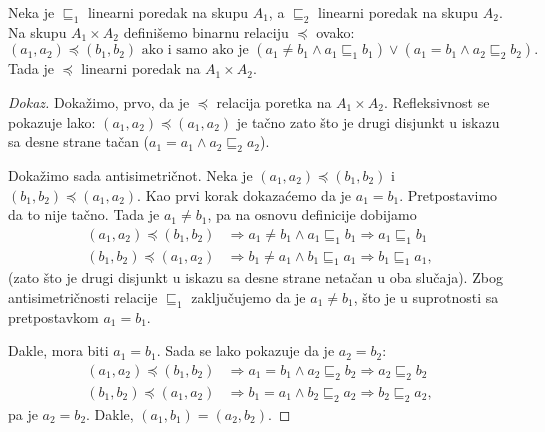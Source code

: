\begin{THM}\label{ft07.thm.lex-2}
  Neka je $\sqsubseteq_1$ linearni poredak na skupu $A_1$, a $\sqsubseteq_2$ linearni poredak na skupu $A_2$.
  Na skupu $A_1 \times A_2$ defini\v semo binarnu relaciju $\preccurlyeq$ ovako:
  $$
    (a_1, a_2) \preccurlyeq (b_1, b_2) \text{\ \ ako i samo ako je\ \ }
    (a_1 \ne b_1 \land a_1 \mathrel{\sqsubseteq_1} b_1) \lor (a_1 = b_1 \land a_2 \mathrel{\sqsubseteq_2} b_2).
  $$
  Tada je $\preccurlyeq$ linearni poredak na $A_1 \times A_2$.
\end{THM}
\begin{proof}[Dokaz]
  Doka\v zimo, prvo, da je $\preccurlyeq$ relacija poretka na $A_1 \times A_2$. Refleksivnost se pokazuje lako:
  $(a_1, a_2) \preccurlyeq (a_1, a_2)$ je ta\v cno zato \v sto je drugi disjunkt u iskazu sa desne strane ta\v can
  ($a_1 = a_1 \land a_2 \mathrel{\sqsubseteq_2} a_2$).
  
  \medskip
  
  Doka\v zimo sada antisimetri\v cnot. Neka je $(a_1, a_2) \preccurlyeq (b_1, b_2)$ i $(b_1, b_2) \preccurlyeq (a_1, a_2)$.
  Kao prvi korak dokaza\'cemo da je $a_1 = b_1$. Pretpostavimo da to nije ta\v cno. Tada je $a_1 \ne b_1$, pa na osnovu
  definicije dobijamo
  \begin{align*}
    (a_1, a_2) \preccurlyeq (b_1, b_2) &\Rightarrow a_1 \ne b_1 \land a_1 \mathrel{\sqsubseteq_1} b_1 \Rightarrow a_1 \mathrel{\sqsubseteq_1} b_1\\
    (b_1, b_2) \preccurlyeq (a_1, a_2) &\Rightarrow b_1 \ne a_1 \land b_1 \mathrel{\sqsubseteq_1} a_1 \Rightarrow b_1 \mathrel{\sqsubseteq_1} a_1,
  \end{align*}
  (zato \v sto je drugi disjunkt u iskazu sa desne strane neta\v can u oba slu\v caja). Zbog antisimetri\v cnosti relacije $\sqsubseteq_1$
  zaklju\v cujemo da je $a_1 \ne b_1$, \v sto je u suprotnosti sa pretpostavkom $a_1 = b_1$.
  
  Dakle, mora biti $a_1 = b_1$. Sada se lako pokazuje da je $a_2 = b_2$:
  \begin{align*}
    (a_1, a_2) \preccurlyeq (b_1, b_2) &\Rightarrow a_1 = b_1 \land a_2 \mathrel{\sqsubseteq_2} b_2 \Rightarrow a_2 \mathrel{\sqsubseteq_2} b_2\\
    (b_1, b_2) \preccurlyeq (a_1, a_2) &\Rightarrow b_1 = a_1 \land b_2 \mathrel{\sqsubseteq_2} a_2 \Rightarrow b_2 \mathrel{\sqsubseteq_2} a_2,
  \end{align*}
  pa je $a_2 = b_2$. Dakle, $(a_1, b_1) = (a_2, b_2)$.
  

\end{proof}
